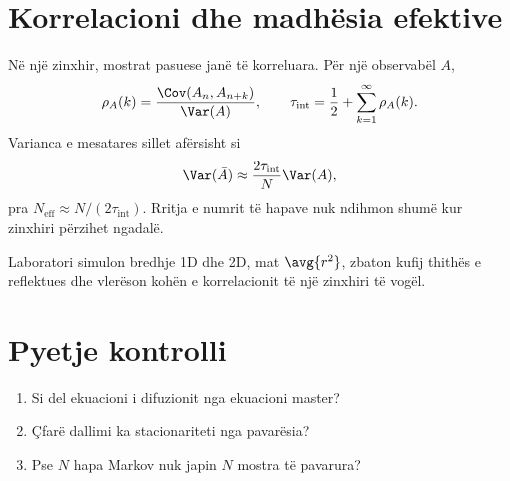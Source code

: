 \section{Korrelacioni dhe madhësia efektive}
Në një zinxhir, mostrat pasuese janë të korreluara. Për një observabël $A$,
\begin{equation}
 \rho_A(k)=\frac{\Cov(A_n,A_{n+k})}{\Var(A)},\qquad
 \tau_{\mathrm{int}}=\frac12+\sum_{k=1}^{\infty}\rho_A(k).
\end{equation}
Varianca e mesatares sillet afërsisht si
\begin{equation}
 \Var(\bar A)\approx\frac{2\tau_{\mathrm{int}}}{N}\Var(A),
\end{equation}
pra $N_{\mathrm{eff}}\approx N/(2\tau_{\mathrm{int}})$. Rritja e numrit të hapave nuk ndihmon shumë kur zinxhiri përzihet ngadalë.

\begin{lidhje}
Laboratori simulon bredhje 1D dhe 2D, mat $\avg{r^2}$, zbaton kufij thithës e reflektues dhe vlerëson kohën e korrelacionit të një zinxhiri të vogël.
\end{lidhje}

\section*{Pyetje kontrolli}
\begin{enumerate}
\item Si del ekuacioni i difuzionit nga ekuacioni master?
\item Çfarë dallimi ka stacionariteti nga pavarësia?
\item Pse $N$ hapa Markov nuk japin $N$ mostra të pavarura?
\end{enumerate}



